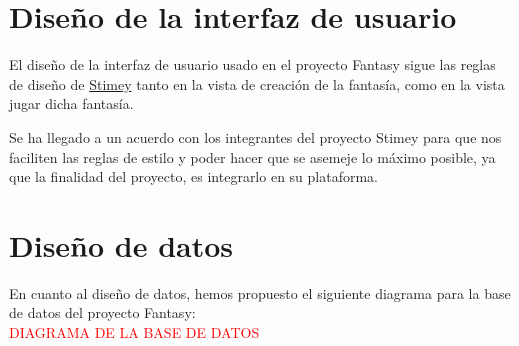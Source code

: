 %

\section{Diseño de la interfaz de usuario}
El diseño de la interfaz de usuario usado en el proyecto Fantasy sigue las reglas de diseño de \href{https://stimey.eu/home}{Stimey} tanto en la vista de creación de la fantasía, como en la vista jugar dicha fantasía.

Se ha llegado a un acuerdo con los integrantes del proyecto Stimey para que nos faciliten las reglas de estilo y poder hacer que se asemeje lo máximo posible, ya que la finalidad del proyecto, es integrarlo en su plataforma.

\section{Diseño de datos}
En cuanto al diseño de datos, hemos propuesto el siguiente diagrama para la base de datos del proyecto Fantasy:\\
\textcolor{red}{DIAGRAMA DE LA BASE DE DATOS}

%
